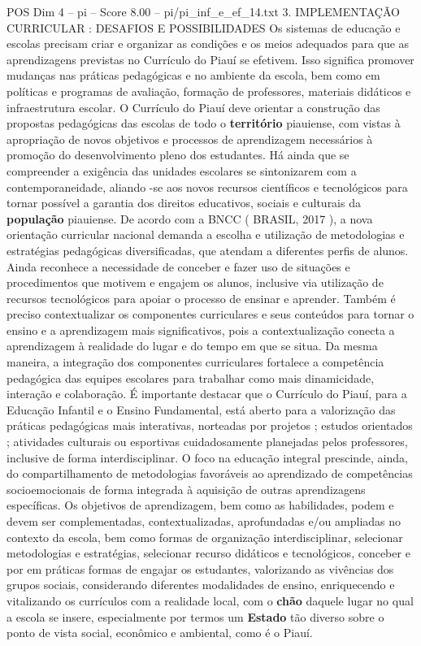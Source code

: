 \begin{textsample}{POS Dim 4 – pi – Score 8.00 – pi/pi\_inf\_e\_ef\_14.txt}  \label{ex:f4_pos_126}
3.
IMPLEMENTAÇÃO CURRICULAR : DESAFIOS E POSSIBILIDADES Os sistemas de educação e escolas precisam criar e organizar as condições e os meios adequados para que as aprendizagens previstas no Currículo do Piauí se efetivem.
Isso significa promover mudanças nas práticas pedagógicas e no ambiente da escola, bem como em políticas e programas de avaliação, formação de professores, materiais didáticos e infraestrutura escolar.
O Currículo do Piauí deve orientar a construção das propostas pedagógicas das escolas de todo o \textbf{território} piauiense, com vistas à apropriação de novos objetivos e processos de aprendizagem necessários à promoção do desenvolvimento pleno dos estudantes.
Há ainda que se compreender a exigência das unidades escolares se sintonizarem com a contemporaneidade, aliando -se aos novos recursos científicos e tecnológicos para tornar possível a garantia dos direitos educativos, sociais e culturais da \textbf{população} piauiense.
De acordo com a BNCC ( BRASIL, 2017 ), a nova orientação curricular nacional demanda a escolha e utilização de metodologias e estratégias pedagógicas diversificadas, que atendam a diferentes perfis de alunos.
Ainda reconhece a necessidade de conceber e fazer uso de situações e procedimentos que motivem e engajem os alunos, inclusive via utilização de recursos tecnológicos para apoiar o processo de ensinar e aprender.
Também é preciso contextualizar os componentes curriculares e seus conteúdos para tornar o ensino e a aprendizagem mais significativos, pois a contextualização conecta a aprendizagem à realidade do lugar e do tempo em que se situa.
Da mesma maneira, a integração dos componentes curriculares fortalece a competência pedagógica das equipes escolares para trabalhar como mais dinamicidade, interação e colaboração.
É importante destacar que o Currículo do Piauí, para a Educação Infantil e o Ensino Fundamental, está aberto para a valorização das práticas pedagógicas mais interativas, norteadas por projetos ; estudos orientados ; atividades culturais ou esportivas cuidadosamente planejadas pelos professores, inclusive de forma interdisciplinar.
O foco na educação integral prescinde, ainda, do compartilhamento de metodologias favoráveis ao aprendizado de competências socioemocionais de forma integrada à aquisição de outras aprendizagens específicas.
Os objetivos de aprendizagem, bem como as habilidades, podem e devem ser complementadas, contextualizadas, aprofundadas e/ou ampliadas no contexto da escola, bem como formas de organização interdisciplinar, selecionar metodologias e estratégias, selecionar recurso didáticos e tecnológicos, conceber e por em práticas formas de engajar os estudantes, valorizando as vivências dos grupos sociais, considerando diferentes modalidades de ensino, enriquecendo e vitalizando os currículos com a realidade local, com o \textbf{chão} daquele lugar no qual a escola se insere, especialmente por termos um \textbf{Estado} tão diverso sobre o ponto de vista social, econômico e ambiental, como é o Piauí.

\end{textsample}
